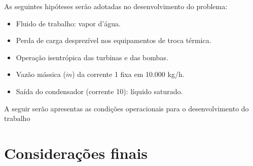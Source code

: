 \documentclass[
	article,			%
	11pt,				%
	oneside,			%
	a4paper,			%
	english,			%
	brazil,				%
	sumario=tradicional
	]{abntex2}
\begin{document}
As seguintes hipóteses serão adotadas no desenvolvimento do problema:

\begin{itemize}
	\item Fluido de trabalho: vapor d’água.
	\item Perda de carga desprezível nos equipamentos de troca térmica.
	\item Operação isentrópica das turbinas e das bombas.
	\item Vazão mássica ($\dot{m}$) da corrente 1 fixa em 10.000 kg/h.
	\item Saída do condensador (corrente 10): líquido saturado.
\end{itemize}

A seguir serão apresentas as condições operacionais para o desenvolvimento do trabalho

%

\section{Considerações finais}

\postextual

\clearpage

\end{document}
